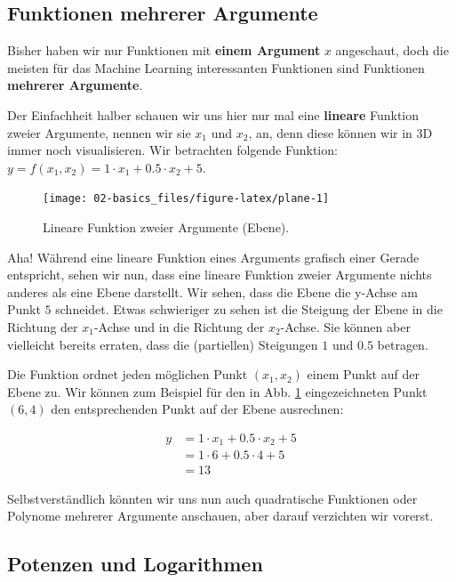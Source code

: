 \documentclass[
]{book}
\begin{document}
\hypertarget{funktionen-mehrerer-argumente}{%
\subsection{Funktionen mehrerer Argumente}\label{funktionen-mehrerer-argumente}}

Bisher haben wir nur Funktionen mit \textbf{einem Argument} \(x\) angeschaut, doch die meisten für das Machine Learning interessanten Funktionen sind Funktionen \textbf{mehrerer Argumente}.

Der Einfachheit halber schauen wir uns hier nur mal eine \textbf{lineare} Funktion zweier Argumente, nennen wir sie \(x_1\) und \(x_2\), an, denn diese können wir in 3D immer noch visualisieren. Wir betrachten folgende Funktion: \(y = f(x_1,x_2) = 1 \cdot x_1 + 0.5 \cdot x_2 + 5\).

\begin{figure}

{\centering \texttt{[image: 02-basics\_files/figure-latex/plane-1]} 

}

\caption{Lineare Funktion zweier Argumente (Ebene).}\label{fig:plane}
\end{figure}

Aha! Während eine lineare Funktion eines Arguments grafisch einer Gerade entspricht, sehen wir nun, dass eine lineare Funktion zweier Argumente nichts anderes als eine Ebene darstellt. Wir sehen, dass die Ebene die y-Achse am Punkt \(5\) schneidet. Etwas schwieriger zu sehen ist die Steigung der Ebene in die Richtung der \(x_1\)-Achse und in die Richtung der \(x_2\)-Achse. Sie können aber vielleicht bereits erraten, dass die (partiellen) Steigungen \(1\) und \(0.5\) betragen.

Die Funktion ordnet jeden möglichen Punkt \((x_1,x_2)\) einem Punkt auf der Ebene zu. Wir können zum Beispiel für den in Abb. \ref{fig:plane} eingezeichneten Punkt \((6,4)\) den entsprechenden Punkt auf der Ebene ausrechnen:

\[ \begin{split}
y &= 1 \cdot x_1 + 0.5 \cdot x_2 + 5\\
&= 1 \cdot 6 + 0.5 \cdot 4 + 5\\
&= 13
\end{split}\]

Selbstverständlich könnten wir uns nun auch quadratische Funktionen oder Polynome mehrerer Argumente anschauen, aber darauf verzichten wir vorerst.

\hypertarget{potenzen-und-logarithmen}{%
\subsection{Potenzen und Logarithmen}\label{potenzen-und-logarithmen}}
\end{document}
